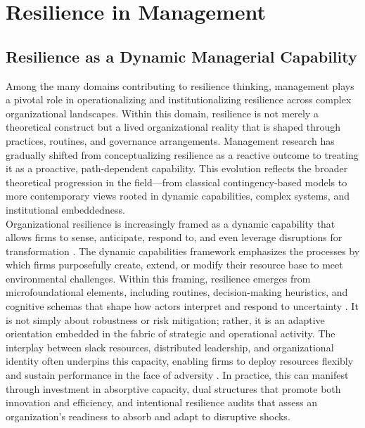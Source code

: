 \section{Resilience in Management}

\subsection{Resilience as a Dynamic Managerial Capability}

Among the many domains contributing to resilience thinking, management plays a pivotal role in operationalizing and institutionalizing resilience across complex organizational landscapes. Within this domain, resilience is not merely a theoretical construct but a lived organizational reality that is shaped through practices, routines, and governance arrangements. Management research has gradually shifted from conceptualizing resilience as a reactive outcome to treating it as a proactive, path-dependent capability. This evolution reflects the broader theoretical progression in the field—from classical contingency-based models to more contemporary views rooted in dynamic capabilities, complex systems, and institutional embeddedness.\\ 

Organizational resilience is increasingly framed as a dynamic capability that allows firms to sense, anticipate, respond to, and even leverage disruptions for transformation \autocite{duchek2020organizational, teece2007explicating}. The dynamic capabilities framework emphasizes the processes by which firms purposefully create, extend, or modify their resource base to meet environmental challenges. Within this framing, resilience emerges from microfoundational elements, including routines, decision-making heuristics, and cognitive schemas that shape how actors interpret and respond to uncertainty \autocite{hepfer2022heterogeneity}. It is not simply about robustness or risk mitigation; rather, it is an adaptive orientation embedded in the fabric of strategic and operational activity. The interplay between slack resources, distributed leadership, and organizational identity often underpins this capacity, enabling firms to deploy resources flexibly and sustain performance in the face of adversity \autocite{bhamra2011resilience, barasa2018what}. In practice, this can manifest through investment in absorptive capacity, dual structures that promote both innovation and efficiency, and intentional resilience audits that assess an organization's readiness to absorb and adapt to disruptive shocks.

